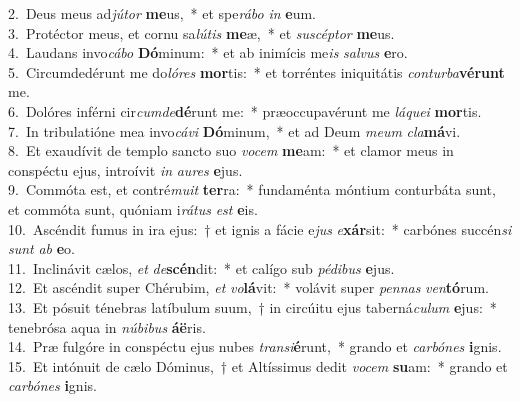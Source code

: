 {2.~}Deus meus ad\textit{jú}\textit{tor} \textbf{me}us,~* et spe\textit{rá}\textit{bo} \textit{in} \textbf{e}um.\\
{3.~}Protéctor meus, et cornu sa\textit{lú}\textit{tis} \textbf{me}æ,~* et \textit{su}\textit{scép}\textit{tor} \textbf{me}us.\\
{4.~}Laudans invo\textit{cá}\textit{bo} \textbf{Dó}minum:~* et ab inimícis me\textit{is} \textit{sal}\textit{vus} \textbf{e}ro.\\
{5.~}Circumdedérunt me do\textit{ló}\textit{res} \textbf{mor}tis:~* et torréntes iniquitátis \textit{con}\textit{tur}\textit{ba}\textbf{vé}\textbf{runt} me.\\
{6.~}Dolóres inférni cir\textit{cum}\textit{de}\textbf{dé}runt me:~* præoccupavérunt me \textit{lá}\textit{que}\textit{i} \textbf{mor}tis.\\
{7.~}In tribulatióne mea invo\textit{cá}\textit{vi} \textbf{Dó}minum,~* et ad Deum \textit{me}\textit{um} \textit{cla}\textbf{má}vi.\\
{8.~}Et exaudívit de templo sancto suo \textit{vo}\textit{cem} \textbf{me}am:~* et clamor meus in conspéctu ejus, introívit \textit{in} \textit{au}\textit{res} \textbf{e}jus.\\
{9.~}Commóta est, et contré\textit{mu}\textit{it} \textbf{ter}ra:~* fundaménta móntium conturbáta sunt, et commóta sunt, quóniam i\textit{rá}\textit{tus} \textit{est} \textbf{e}is.\\
{10.~}Ascéndit fumus in ira ejus:~† et ignis a fácie e\textit{jus} \textit{e}\textbf{xár}sit:~* carbónes succén\textit{si} \textit{sunt} \textit{ab} \textbf{e}o.\\
{11.~}Inclinávit cælos, \textit{et} \textit{de}\textbf{scén}dit:~* et calígo sub \textit{pé}\textit{di}\textit{bus} \textbf{e}jus.\\
{12.~}Et ascéndit super Chérubim, \textit{et} \textit{vo}\textbf{lá}vit:~* volávit super \textit{pen}\textit{nas} \textit{ven}\textbf{tó}rum.\\
{13.~}Et pósuit ténebras latíbulum suum,~† in circúitu ejus taberná\textit{cu}\textit{lum} \textbf{e}jus:~* tenebrósa aqua in \textit{nú}\textit{bi}\textit{bus} \textbf{á}\textbf{ë}ris.\\
{14.~}Præ fulgóre in conspéctu ejus nubes \textit{tran}\textit{si}\textbf{é}runt,~* grando et \textit{car}\textit{bó}\textit{nes} \textbf{i}gnis.\\
{15.~}Et intónuit de cælo Dóminus,~† et Altíssimus dedit \textit{vo}\textit{cem} \textbf{su}am:~* grando et \textit{car}\textit{bó}\textit{nes} \textbf{i}gnis.\\
